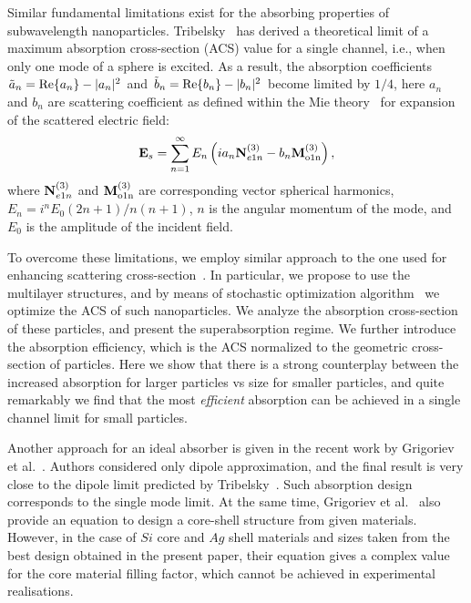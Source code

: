 \documentclass[aps,prl,twocolumn,showpacs,superscriptaddress,groupedaddress]{revtex4-1}
\begin{document}
Similar fundamental limitations exist for the absorbing properties of
subwavelength nanoparticles.  Tribelsky~\cite{Tribelsky-2011} has
derived a theoretical limit of a maximum absorption cross-section
(ACS) value for a single channel, i.e., when only one mode of a sphere
is excited.  As a result, the absorption coefficients $\tilde{a}_n=
{\rm Re}\{a_n\} - |a_n|^2 $ and $\tilde{b}_n= {\rm Re}\{b_n\} -
|b_n|^2 $ become limited by $1/4$, here $a_n$ and $b_n$ are scattering
coefficient as defined within the Mie theory~\cite{Bohren-1983} for
expansion of the scattered electric field:
$$ 
 {\rm \mathbf{E}}_s = \sum_{n=1}^{\infty} E_n
 \left(
   i a_n {\rm \mathbf{N}}_{e1n}^{(3)} - b_n{\rm\mathbf{M}_{o1n}^{(3)}}
 \right),
$$
where ${\rm \mathbf{N}}_{e1n}^{(3)}$ and ${\rm\mathbf{M}_{o1n}^{(3)}}$
are corresponding vector spherical harmonics,
$E_n=i^nE_0(2n+1)/n(n+1)$, $n$ is the angular momentum of the mode,
and $E_0$ is the amplitude of the incident field.

To overcome these limitations, we employ similar approach to the one
used for enhancing scattering cross-section~\cite{Fan-2011}. In
particular, we propose to use the multilayer structures, and by means
of stochastic optimization algorithm~\cite{Jingqiao-JADE-2009} we
optimize the ACS of such nanoparticles. We analyze the absorption
cross-section of these particles, and present the superabsorption
regime. We further introduce the absorption efficiency, which is the
ACS normalized to the geometric cross-section of particles. Here we
show that there is a strong counterplay between the increased
absorption for larger particles vs size for smaller particles, and
quite remarkably we find that the most {\em efficient} absorption can
be achieved in a single channel limit for small particles.

Another approach for an ideal absorber is given in the recent work by
Grigoriev et al.~\cite{Grigoriev-2015}. Authors considered only dipole
approximation, and the final result is very close to the dipole limit
predicted by Tribelsky~\cite{Tribelsky-2011}.  Such absorption design
corresponds to the single mode limit.  At the same time, Grigoriev et
al.~\cite{Grigoriev-2015} also provide an equation to design a
core-shell structure from given materials. However, in the case of
$Si$ core and $Ag$ shell materials and sizes taken from the best
design obtained in the present paper, their equation gives a complex
value for the core material filling factor, which cannot be achieved
in experimental realisations.

\begin{figure}
\end{figure}
\end{document}
